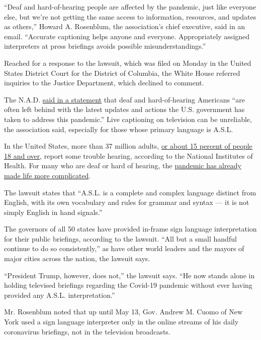 ``Deaf and hard-of-hearing people are affected by the pandemic, just
like everyone else, but we're not getting the same access to
information, resources, and updates as others,'' Howard A. Rosenblum,
the association's chief executive, said in an email. ``Accurate
captioning helps anyone and everyone. Appropriately assigned
interpreters at press briefings avoids possible misunderstandings.''

Reached for a response to the lawsuit, which was filed on Monday in the
United States District Court for the District of Columbia, the White
House referred inquiries to the Justice Department, which declined to
comment.

The N.A.D.
\href{https://www.nad.org/2020/08/03/nad-sues-white-house/}{said in a
statement} that deaf and hard-of-hearing Americans ``are often left
behind with the latest updates and actions the U.S. government has taken
to address this pandemic.'' Live captioning on television can be
unreliable, the association said, especially for those whose primary
language is A.S.L.

In the United States, more than 37 million adults,
\href{https://www.nidcd.nih.gov/health/statistics/quick-statistics-hearing}{or
about 15 percent of people 18 and over}, report some trouble hearing,
according to the National Institutes of Health. For many who are deaf or
hard of hearing, the
\href{https://www.nytimes3xbfgragh.onion/2020/06/04/us/coronavirus-deaf-culture-challenges.html}{pandemic
has already made life more complicated}.

The lawsuit states that ``A.S.L. is a complete and complex language
distinct from English, with its own vocabulary and rules for grammar and
syntax --- it is not simply English in hand signals.''

The governors of all 50 states have provided in-frame sign language
interpretation for their public briefings, according to the lawsuit.
``All but a small handful continue to do so consistently,'' as have
other world leaders and the mayors of major cities across the nation,
the lawsuit says.

``President Trump, however, does not,'' the lawsuit says. ``He now
stands alone in holding televised briefings regarding the Covid-19
pandemic without ever having provided any A.S.L. interpretation.''

Mr. Rosenblum noted that up until May 13, Gov. Andrew M. Cuomo of New
York used a sign language interpreter only in the online streams of his
daily coronavirus briefings, not in the television broadcasts.

